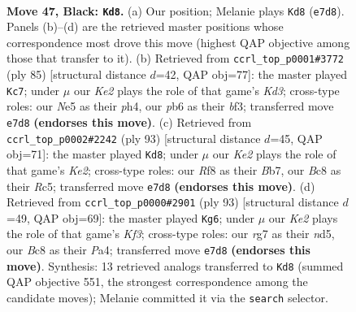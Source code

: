 \documentclass[11pt]{article}
\begin{document}
\clearpage

\begin{figure}[p]\centering
\begin{subfigure}{0.46\textwidth}\centering
\resizebox{\linewidth}{!}{%
\newchessgame
\chessboard[
  setfen={2b2r2/p3k1Rp/1P6/4nP2/1p1p4/8/p3P3/1N1K4 b - - 1 47},
  showmover=false,
  pgfstyle=straightmove, color=movearrow, markmove={e7-d8}
]}
\caption{}
\end{subfigure}\hfill
\begin{subfigure}{0.46\textwidth}\centering
\resizebox{\linewidth}{!}{%
\newchessgame
\chessboard[
  setfen={8/3b2p1/pR1k4/2p1rP1p/6PP/3K1B2/P7/8 b - - 1 43},
  showmover=false,
  pgfstyle=straightmove, color=movearrow, markmove={d6-c7}
]}
\caption{}
\end{subfigure}
\\[4pt]
\begin{subfigure}{0.46\textwidth}\centering
\resizebox{\linewidth}{!}{%
\newchessgame
\chessboard[
  setfen={8/1b2k1Rp/8/n1r1p1PB/1p5N/1P4p1/5PP1/6K1 b - - 0 47},
  showmover=false,
  pgfstyle=straightmove, color=movearrow, markmove={e7-d8}
]}
\caption{}
\end{subfigure}\hfill
\begin{subfigure}{0.46\textwidth}\centering
\resizebox{\linewidth}{!}{%
\newchessgame
\chessboard[
  setfen={8/R5pp/5k2/3N4/p3r1P1/P2n2BP/8/2b4K b - - 16 47},
  showmover=false,
  pgfstyle=straightmove, color=movearrow, markmove={f6-g6}
]}
\caption{}
\end{subfigure}
\caption{\textbf{Move 47, Black: \texttt{Kd8}.} (a) Our position; Melanie plays \texttt{Kd8} (\texttt{e7d8}). Panels (b)--(d) are the retrieved master positions whose correspondence most drove this move (highest QAP objective among those that transfer to it). (b) Retrieved from \texttt{ccrl\_top\_p0001\#3772} (ply 85) [structural distance $d$=42, QAP obj=77]: the master played \texttt{Kc7}; under $\mu$ our \emph{Ke2} plays the role of that game's \emph{Kd3}; cross-type roles: our \emph{N}e5 as their \emph{p}h4, our \emph{p}b6 as their \emph{b}f3; transferred move \texttt{e7d8} \textbf{(endorses this move)}. (c) Retrieved from \texttt{ccrl\_top\_p0002\#2242} (ply 93) [structural distance $d$=45, QAP obj=71]: the master played \texttt{Kd8}; under $\mu$ our \emph{Ke2} plays the role of that game's \emph{Ke2}; cross-type roles: our \emph{R}f8 as their \emph{B}b7, our \emph{B}c8 as their \emph{R}c5; transferred move \texttt{e7d8} \textbf{(endorses this move)}. (d) Retrieved from \texttt{ccrl\_top\_p0000\#2901} (ply 93) [structural distance $d$=49, QAP obj=69]: the master played \texttt{Kg6}; under $\mu$ our \emph{Ke2} plays the role of that game's \emph{Kf3}; cross-type roles: our \emph{r}g7 as their \emph{n}d5, our \emph{B}c8 as their \emph{P}a4; transferred move \texttt{e7d8} \textbf{(endorses this move)}. Synthesis: 13 retrieved analogs transferred to \texttt{Kd8} (summed QAP objective 551, the strongest correspondence among the candidate moves); Melanie committed it via the \texttt{search} selector.}
\label{fig:thought-m93}
\end{figure}
\end{document}
